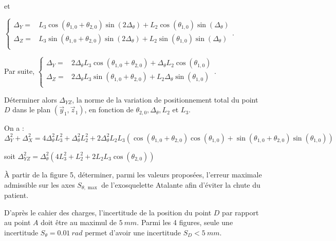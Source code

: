 \documentclass[11pt]{article}
\begin{document}
\begin{UPSTIcorrige}
et

$
\left\{
\begin{array}{ll}
\Delta_{Y}=&   L_3\cos \left(\theta_{1,0}+ \theta_{2,0}\right) \sin \left(2\Delta_{\theta} \right)
+ L_2 \cos \left(\theta_{1,0}\right) \sin \left(\Delta_{\theta} \right)\\
\Delta_{Z}=& L_3  \sin \left(\theta_{1,0} + \theta_{2,0}\right) \sin\left(2\Delta_{\theta} \right) 
+L_2 \sin \left(\theta_{1,0} \right) \sin\left(\Delta_{\theta} \right)\\
\end{array}.
\right.
$

Par suite, 
$
\left\{
\begin{array}{ll}
\Delta_{Y}=&  2\Delta_{\theta}  L_3\cos \left(\theta_{1,0}+ \theta_{2,0}\right) 
+\Delta_{\theta}  L_2 \cos \left(\theta_{1,0}\right) \\
\Delta_{Z}=& 2\Delta_{\theta} L_3  \sin \left(\theta_{1,0} + \theta_{2,0}\right)  
+L_2 \Delta_{\theta}\sin \left(\theta_{1,0} \right) \\
\end{array}.
\right.
$


\end{UPSTIcorrige}

\UPSTIquestion Déterminer alors $\Delta_{Y Z}$, la norme de la variation de positionnement total du point $D$ dans le plan $\left(\vec{y}_{1}, \vec{z}_{1}\right)$, en fonction de $\theta_{2,0}, \Delta_{\theta}, L_{2}$ et $L_{3}$.

\begin{UPSTIcorrige}
 On a : 
$\Delta_{Y}^2 + \Delta_{X}^2 = 4\Delta_{\theta}^2L_3^2 + \Delta_{\theta}^2L_2^2 
+ 2\Delta_{\theta}^2 L_2 L_3 \left( \cos \left(\theta_{1,0}+ \theta_{2,0}\right)  \cos \left(\theta_{1,0}\right)
+  \sin \left(\theta_{1,0}+ \theta_{2,0}\right)  \sin \left(\theta_{1,0}\right) \right)$

soit 
$\Delta_{YZ}^2 = \Delta_{\theta}^2 \left(4L_3^2 + L_2^2 
+ 2 L_2 L_3 \cos \left(\theta_{2,0} \right)\right)$
\end{UPSTIcorrige}

\UPSTIquestion À partir de la figure 5, déterminer, parmi les valeurs proposées, l'erreur maximale admissible sur les axes $S_{\theta, \max }$ de l'exosquelette Atalante afin d'éviter la chute du patient.

\begin{UPSTIcorrige}
D'après le cahier des charges, l'incertitude de la position du point
$D$ par rapport au point  $A$  doit être au maximul de $\SI{5}{mm}$. Parmi les 4 figures, seule une incertitude $S_{\theta}=\SI{0,01}{rad}$ permet d'avoir une incertitude $S_D < \SI{5}{mm}$.

\end{UPSTIcorrige}
\end{document}
